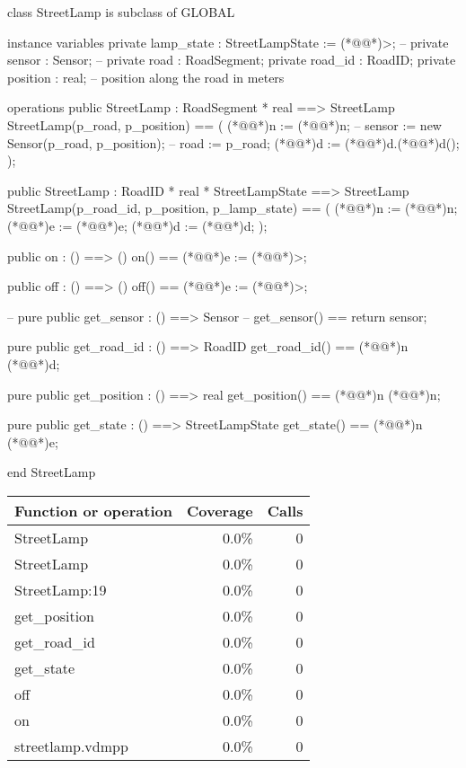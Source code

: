 \documentclass[a4paper]{article}
\begin{document}
\title{}
\author{}
\begin{vdm_al}
class StreetLamp is subclass of GLOBAL

instance variables
    private lamp_state : StreetLampState := (*@@*)>;
    -- private sensor : Sensor;
    -- private road : RoadSegment;
    private road_id : RoadID;
    private position : real; -- position along the road in meters

operations
    public StreetLamp : RoadSegment * real ==> StreetLamp
    StreetLamp(p_road, p_position) == (
        (*@@*)n := (*@@*)n;
        -- sensor := new Sensor(p_road, p_position);
        -- road := p_road;
        (*@@*)d := (*@@*)d.(*@@*)d();
    );

    public StreetLamp : RoadID * real * StreetLampState ==> StreetLamp
    StreetLamp(p_road_id, p_position, p_lamp_state) == (
        (*@@*)n := (*@@*)n;
        (*@@*)e := (*@@*)e;
        (*@@*)d := (*@@*)d;
    );

    public on : () ==> ()
    on() == (*@@*)e := (*@@*)>;

    public off : () ==> ()
    off() == (*@@*)e := (*@@*)>;

    -- pure public get_sensor : () ==> Sensor
    -- get_sensor() == return sensor;

    pure public get_road_id : () ==> RoadID
    get_road_id() == (*@@*)n (*@@*)d;

    pure public get_position : () ==> real
    get_position() == (*@@*)n (*@@*)n;

    pure public get_state : () ==> StreetLampState
    get_state() == (*@@*)n (*@@*)e;

end StreetLamp
\end{vdm_al}
\bigskip
\begin{longtable}{|l|r|r|}
\hline
Function or operation & Coverage & Calls \\
\hline
\hline
StreetLamp & 0.0\% & 0 \\
\hline
StreetLamp & 0.0\% & 0 \\
\hline
StreetLamp:19 & 0.0\% & 0 \\
\hline
get\_position & 0.0\% & 0 \\
\hline
get\_road\_id & 0.0\% & 0 \\
\hline
get\_state & 0.0\% & 0 \\
\hline
off & 0.0\% & 0 \\
\hline
on & 0.0\% & 0 \\
\hline
\hline
streetlamp.vdmpp & 0.0\% & 0 \\
\hline
\end{longtable}
\end{document}
